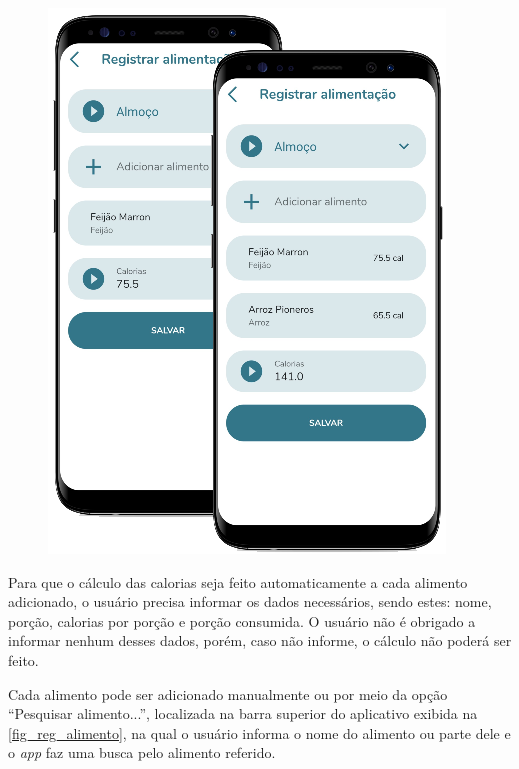 \begin{figure}[htb]
\begin{minipage}{0.58\textwidth}
        \includegraphics[scale=0.66]{Imagens/desenvolvimento/app/reg_alimentacao_2.png}
    \end{minipage}
\end{figure}

Para que o cálculo das calorias seja feito automaticamente a cada alimento adicionado, o usuário precisa
informar os dados necessários, sendo estes: nome, porção, calorias por porção e porção consumida. O usuário
não é obrigado a informar nenhum desses dados, porém, caso não informe, o cálculo não poderá ser feito.

\newpage

Cada alimento pode ser adicionado manualmente ou por meio da opção ``Pesquisar alimento...'', localizada
na barra superior do aplicativo exibida na \autoref{fig_reg_alimento}, na qual o usuário
informa o nome do alimento ou parte dele e o \emph{app} faz uma busca pelo alimento referido.

